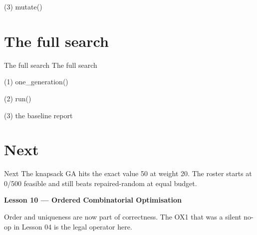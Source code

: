 \begin{frame}[fragile]{(3) mutate()}

\end{frame}


\section{The full search}

\begin{frame}{The full search}
The full search
\end{frame}

\begin{frame}[fragile]{(1) one\_generation()}

\end{frame}

\begin{frame}[fragile]{(2) run()}

\end{frame}

\begin{frame}[fragile]{(3) the baseline report}

\end{frame}


\section{Next}

\begin{frame}{Next}
The knapsack GA hits the exact value 50 at weight 20. The roster starts at 0/500 feasible and still beats repaired-random at equal budget.

\vspace{0.8em}
\textbf{Lesson 10 --- Ordered Combinatorial Optimisation}

Order and uniqueness are now part of correctness. The OX1 that was a silent no-op in Lesson 04 is the legal operator here.
\end{frame}

